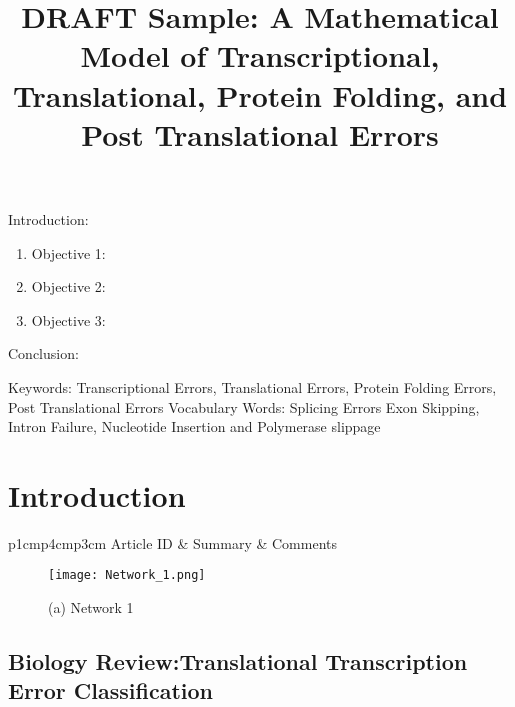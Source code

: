 

\twocolumn
\scriptsize
\begin{frontmatter}
		\title{DRAFT Sample: A Mathematical Model of Transcriptional, Translational, Protein Folding, and Post Translational Errors}
		\author{}
		\address{The Mathematical Learning Space}
\end{frontmatter}	

Introduction:
\begin{enumerate}
\item Objective 1:
\item Objective 2:
\item Objective 3:
\end{enumerate}
Conclusion:

Keywords: Transcriptional Errors, Translational Errors, Protein Folding Errors, Post Translational Errors
Vocabulary Words: Splicing Errors Exon Skipping, Intron Failure, Nucleotide Insertion and Polymerase slippage

\section{Introduction}

\begin{table}[H]\centering
	\begin{tabular}{p{1cm}p{4cm}p{3cm}}
		Article ID & Summary & Comments\\
		\hline
		\hline
	\end{tabular}
\end{table}

\begin{figure}[H]
\begin{minipage}[b]{0.3\linewidth}
\texttt{[image: Network\_1.png]} 
\end{minipage}\hfill
\caption{(a) Network 1}
\label{fig:Figure1}
\end{figure} 

\subsection{Biology Review:Translational Transcription Error Classification}

